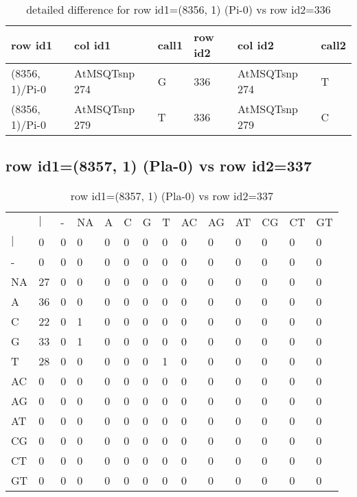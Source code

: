 \begin{center}
\begin{longtable}{|l|l|l|l|l|l|}
\caption{detailed difference for row id1=(8356, 1) (Pi-0) vs row id2=336} \label{table_dm385}\\
\hline
row id1&col id1&call1&row id2&col id2&call2\\
\hline
(8356, 1)/Pi-0&AtMSQTsnp 274&G&336&AtMSQTsnp 274&T\\
(8356, 1)/Pi-0&AtMSQTsnp 279&T&336&AtMSQTsnp 279&C\\
\hline
\end{longtable}
\end{center}

\subsection{row id1=(8357, 1) (Pla-0) vs row id2=337}
\begin{center}
\begin{longtable}{|l|l|l|l|l|l|l|l|l|l|l|l|l|l|}
\caption{row id1=(8357, 1) (Pla-0) vs row id2=337} \label{table_dm386}\\
\hline
\\
\hline
&$|$&-&NA&A&C&G&T&AC&AG&AT&CG&CT&GT\\
$|$&0&0&0&0&0&0&0&0&0&0&0&0&0\\
-&0&0&0&0&0&0&0&0&0&0&0&0&0\\
NA&27&0&0&0&0&0&0&0&0&0&0&0&0\\
A&36&0&0&0&0&0&0&0&0&0&0&0&0\\
C&22&0&1&0&0&0&0&0&0&0&0&0&0\\
G&33&0&1&0&0&0&0&0&0&0&0&0&0\\
T&28&0&0&0&0&0&1&0&0&0&0&0&0\\
AC&0&0&0&0&0&0&0&0&0&0&0&0&0\\
AG&0&0&0&0&0&0&0&0&0&0&0&0&0\\
AT&0&0&0&0&0&0&0&0&0&0&0&0&0\\
CG&0&0&0&0&0&0&0&0&0&0&0&0&0\\
CT&0&0&0&0&0&0&0&0&0&0&0&0&0\\
GT&0&0&0&0&0&0&0&0&0&0&0&0&0\\
\hline
\end{longtable}
\end{center}

